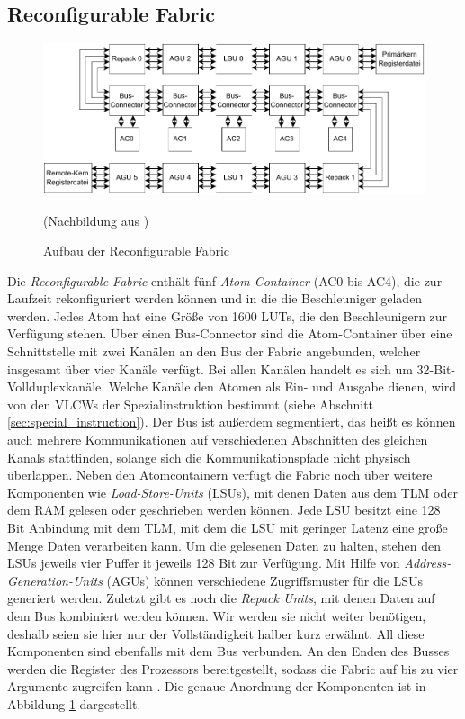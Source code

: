 \subsection{Reconfigurable Fabric}
\begin{figure}
    \center
    \includegraphics{images/Icore_Fabric.pdf}
    \caption{Aufbau der Reconfigurable Fabric}
	(Nachbildung aus \cite{hering2020})
    \label{fig:icore_fabric}
\end{figure}
Die \textit{Reconfigurable Fabric} enthält fünf \textit{Atom-Container} (AC0 bis AC4), die zur Laufzeit rekonfiguriert werden können und in die die Beschleuniger geladen werden.
Jedes Atom hat eine Größe von 1600 LUTs, die den Beschleunigern zur Verfügung stehen. Über einen Bus-Connector sind die Atom-Container über eine Schnittstelle mit zwei Kanälen
an den Bus der Fabric angebunden, welcher insgesamt über vier Kanäle verfügt. Bei allen Kanälen handelt es sich um 32-Bit-Vollduplexkanäle.
Welche Kanäle den Atomen als Ein- und Ausgabe dienen, wird von den VLCWs der Spezialinstruktion bestimmt (siehe Abschnitt \ref{sec:special_instruction}). 
Der Bus ist außerdem segmentiert, das heißt es können auch mehrere Kommunikationen auf verschiedenen Abschnitten des gleichen Kanals stattfinden,
solange sich die Kommunikationspfade nicht physisch überlappen. Neben den Atomcontainern verfügt die Fabric
noch über weitere Komponenten wie \textit{Load-Store-Units} (LSUs), mit denen Daten aus dem TLM oder dem RAM gelesen oder geschrieben werden können.
Jede LSU besitzt eine 128 Bit Anbindung mit dem TLM, mit dem die LSU mit geringer Latenz eine große Menge Daten verarbeiten kann.
Um die gelesenen Daten zu halten, stehen den LSUs jeweils vier Puffer it jeweils 128 Bit zur Verfügung. Mit Hilfe von \textit{Address-Generation-Units} (AGUs)
können verschiedene Zugriffsmuster für die LSUs generiert werden. Zuletzt gibt es noch die \textit{Repack Units}, mit denen Daten auf dem Bus
kombiniert werden können. Wir werden sie nicht weiter benötigen, deshalb seien sie hier nur der Vollständigkeit halber kurz erwähnt.
All diese Komponenten sind ebenfalls mit dem Bus verbunden. An den Enden des Busses werden die Register des Prozessors bereitgestellt,
sodass die Fabric auf bis zu vier Argumente zugreifen kann \cite{riedlberger2013}. Die genaue Anordnung der Komponenten ist in Abbildung \ref{fig:icore_fabric} dargestellt.

